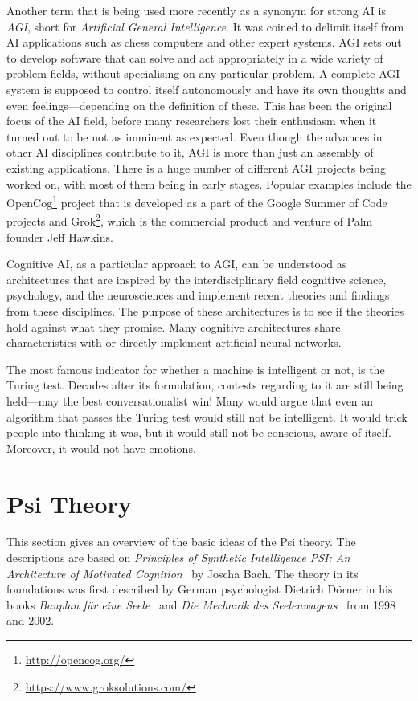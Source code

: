 Another term that is being used more recently as a synonym for strong AI is \emph{AGI}, short for \emph{Artificial General Intelligence}. It was coined to delimit itself from AI applications such as chess computers and other expert systems. AGI sets out to develop software that can solve and act appropriately in a wide variety of problem fields, without specialising on any particular problem. A complete AGI system is supposed to control itself autonomously and have its own thoughts and even feelings---depending on the definition of these. This has been the original focus of the AI field, before many researchers lost their enthusiasm when it turned out to be not as imminent as expected. Even though the advances in other AI disciplines contribute to it, AGI is more than just an assembly of existing applications. There is a huge number of different AGI projects being worked on, with most of them being in early stages. Popular examples include the OpenCog\footnote{\url{http://opencog.org/}} project that is developed as a part of the Google Summer of Code projects and Grok\footnote{\url{https://www.groksolutions.com/}}, which is the commercial product and venture of Palm founder Jeff Hawkins.~\cite{goertzel2007artificial} 

Cognitive AI, as a particular approach to AGI, can be understood as architectures that are inspired by the interdisciplinary field cognitive science, psychology, and the neurosciences and implement recent theories and findings from these disciplines. The purpose of these architectures is to see if the theories hold against what they promise. Many cognitive architectures share characteristics with or directly implement artificial neural networks.

The most famous indicator for whether a machine is intelligent or not, is the Turing test. Decades after its formulation, contests regarding to it are still being held---may the best conversationalist win! Many would argue that even an algorithm that passes the Turing test would still not be intelligent. It would trick people into thinking it was, but it would still not be conscious, aware of itself. Moreover, it would not have emotions.~\cite{russell2009artificial}

    \section{Psi Theory}

This section gives an overview of the basic ideas of the Psi theory. The descriptions are based on \emph{Principles of Synthetic Intelligence PSI: An Architecture of Motivated Cognition}~\cite{Bach:2009:PSI:1611304} by Joscha Bach. The theory in its foundations was first described by German psychologist Dietrich Dörner in his books \emph{Bauplan für eine Seele}~\cite{Doerner1998} and \emph{Die Mechanik des Seelenwagens}~\cite{dorner2002mechanik} from 1998 and 2002.

